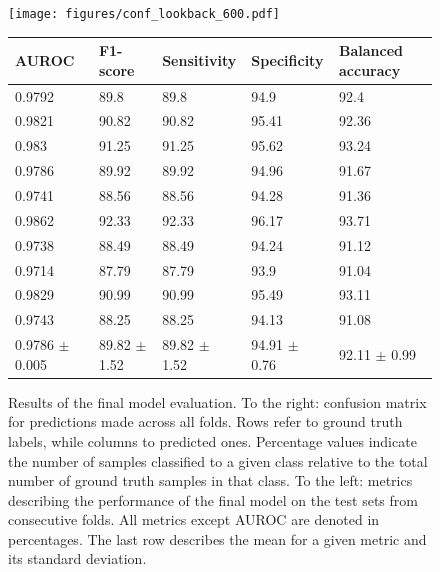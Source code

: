 \documentclass[a4paper,fleqn]{cas-sc}
\begin{document}
\begin{figure}[hbt]
  \hspace*{\fill}%
  \begin{minipage}[t]{0.45\textwidth}
    \centering
    \vspace{0pt}
    \texttt{[image: figures/conf\_lookback\_600.pdf]}
    \label{fig:conf-matrix}
  \end{minipage}%
  \begin{minipage}[t]{0.55\textwidth}
  \centering
  \vspace{0pt}
    \begin{tabular}{|p{0.5in}|p{0.5in}|p{0.5in}|p{0.5in}|p{0.5in}|}
    \hline
    AUROC & F1-score & Sensitivity & Specificity & Balanced \newline accuracy \\
    \hline
    0.9792 & 89.8 & 89.8 & 94.9 & 92.4 \\
    0.9821 & 90.82 & 90.82 & 95.41 & 92.36 \\
    0.983 & 91.25 & 91.25 & 95.62 & 93.24 \\
    0.9786 & 89.92 & 89.92 & 94.96 & 91.67 \\
    0.9741 & 88.56 & 88.56 & 94.28 & 91.36 \\
    0.9862 & 92.33 & 92.33 & 96.17 & 93.71 \\
    0.9738 & 88.49 & 88.49 & 94.24 & 91.12 \\
    0.9714 & 87.79 & 87.79 & 93.9 & 91.04 \\
    0.9829 & 90.99 & 90.99 & 95.49 & 93.11 \\
    0.9743 & 88.25 & 88.25 & 94.13 & 91.08 \\
    \hline
    0.9786 \newline $\pm$ 0.005 & 89.82 \newline $\pm$ 1.52 & 89.82 \newline $\pm$ 1.52 & 94.91 \newline $\pm$ 0.76 & 92.11 \newline $\pm$ 0.99 \\
    \hline
    \end{tabular}

    \label{tab:final-runs-metrics}
  \end{minipage}
  
  \addtocounter{figure}{-1}
    \captionsetup{labelformat=andtable}
    \caption{Results of the final model evaluation. To the right: confusion matrix for predictions made across all folds. Rows refer to ground truth labels, while columns to predicted ones. Percentage values indicate the number of samples classified to a given class relative to the total number of ground truth samples in that class. To the left: metrics describing the performance of the final model on the test sets from consecutive folds. All metrics except AUROC are denoted in percentages. The last row describes the mean for a given metric and its standard deviation.}
\end{figure}
\end{document}
